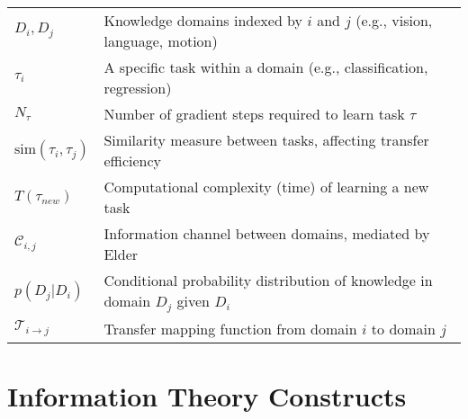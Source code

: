 \begin{tabular}{p{3cm} p{12cm}}
$D_i, D_j$ & Knowledge domains indexed by $i$ and $j$ (e.g., vision, language, motion) \\
$\tau_i$ & A specific task within a domain (e.g., classification, regression) \\
$N_{\tau}$ & Number of gradient steps required to learn task $\tau$ \\
$\text{sim}(\tau_i, \tau_j)$ & Similarity measure between tasks, affecting transfer efficiency \\
$T(\tau_{new})$ & Computational complexity (time) of learning a new task \\
$\mathcal{C}_{i,j}$ & Information channel between domains, mediated by Elder \\
$p(D_j|D_i)$ & Conditional probability distribution of knowledge in domain $D_j$ given $D_i$ \\
$\mathcal{T}_{i \to j}$ & Transfer mapping function from domain $i$ to domain $j$ \\
\end{tabular}

\newpage
\section*{Information Theory Constructs}

